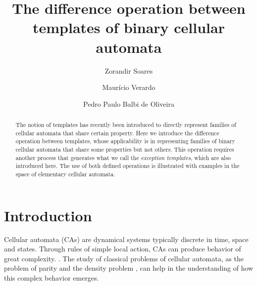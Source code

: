 \documentclass{llncs}
\begin{document}
\pagestyle{headings}  %

\title{The difference operation between templates of binary cellular automata}


\author{Zorandir Soares \and Maurício Verardo \and
Pedro Paulo Balbi de Oliveira}




\maketitle              %

\begin{abstract}
The notion of templates has recently been introduced to directly represent families of cellular automata that share certain property. Here we introduce the difference operation between templates, whose applicability is in representing families of binary cellular automata that share some properties but not others. This operation requires another process that generates what we call the \textit{exception templates}, which are also introduced here. The use of both defined operations is illustrated with examples in the space of elementary cellular automata.
\end{abstract}
%
\section{Introduction}
\label{sec:introducao}
Cellular automata (CAs) are dynamical systems typically discrete in time, space and states.
Through rules of simple local action, CAs can produce behavior of great complexity. \cite{wolfram2002}. The study of classical problems of cellular automata, as the problem of parity \cite{Betel2013} and the density problem \cite{deOliveira2014density}, can help in the understanding of how this complex behavior emerges. %
\end{document}
